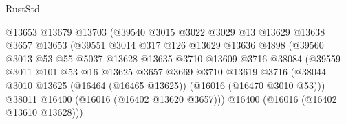 \begin{lexlean}{RustStd}
\begin{coremodule}
                                      @13653
                                      @13679
                                      @13703
                                      (@39540
                                        @3015
                                        @3022
                                        @3029
                                        @13
                                        @13629
                                        @13638
                                        @3657
                                        @13653
                                        (@39551
                                          @3014
                                          @317
                                          @126
                                          @13629
                                          @13636
                                          @4898
                                          (@39560
                                            @3013
                                            @53
                                            @55
                                            @5037
                                            @13628
                                            @13635
                                            @3710
                                            @13609
                                            @3716
                                            @38084
                                            (@39559
                                              @3011
                                              @101
                                              @53
                                              @16
                                              @13625
                                              @3657
                                              @3669
                                              @3710
                                              @13619
                                              @3716
                                              (@38044
                                                @3010
                                                @13625
                                                (@16464 (@16465 @13625))
                                                (@16016 (@16470 @3010 @53)))
                                              @38011
                                              @16400
                                              (@16016 (@16402 @13620 @3657)))
                                            @16400
                                            (@16016 (@16402 @13610 @13628)))

\end{coremodule}
\end{lexlean}
